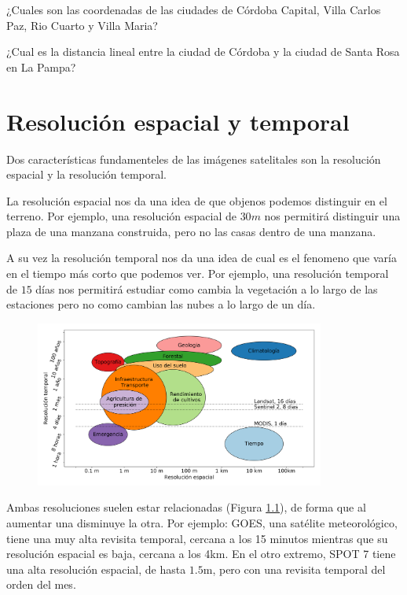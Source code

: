 \documentclass[a4paper,12pt]{book}
\begin{document}
\begin{que}
    ¿Cuales son las coordenadas de las ciudades de Córdoba Capital, Villa Carlos Paz, Rio Cuarto y Villa Maria?
\end{que}

\begin{que}
    ¿Cual es la distancia lineal entre la ciudad de Córdoba y la ciudad de Santa Rosa en La Pampa?
\end{que}

\chapter{Resolución espacial y temporal}
Dos características fundamenteles de las imágenes satelitales son la resolución espacial y la resolución temporal.

La resolución espacial nos da una idea de que objenos podemos distinguir en el terreno. Por ejemplo, una resolución espacial de $30m$ nos permitirá distinguir una plaza de una manzana construida, pero no las casas dentro de una manzana.

A su vez la resolución temporal nos da una idea de cual es el fenomeno que varía en el tiempo más corto que podemos ver. Por ejemplo, una resolución temporal de $15$ días nos permitirá estudiar como cambia la vegetación a lo largo de las estaciones pero no como cambian las nubes a lo largo de un día.

\begin{figure}[h!]
    \centering
    \includegraphics[width=0.85\textwidth]{fig:evst.png}
    \caption{}
    \label{fig:evst}
\end{figure}


Ambas resoluciones suelen estar relacionadas (Figura \ref{fig:evst}), de forma que al aumentar una disminuye la otra. Por ejemplo: GOES, una satélite meteorológico, tiene una muy alta revisita temporal, cercana a los 15 minutos mientras que su resolución espacial es baja, cercana a los 4km. En el otro extremo, SPOT 7 tiene una alta resolución espacial, de hasta $1.5$m, pero con una revisita temporal del orden del mes.
\end{document}

